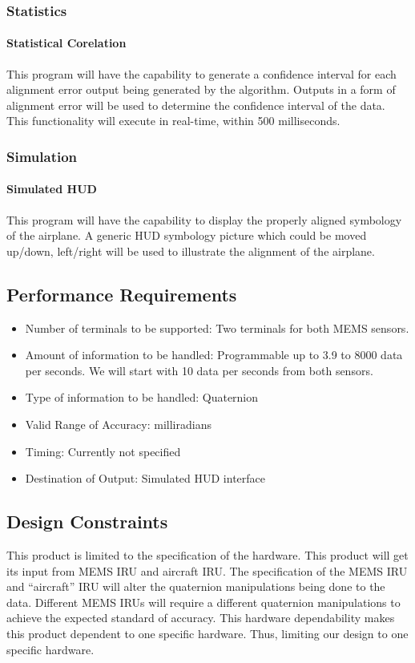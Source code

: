 \subsubsection{Statistics}
\paragraph{Statistical Corelation}
This program will have the capability to generate a confidence interval for each alignment error output being generated by the algorithm. Outputs in a form of alignment error will be used to determine the confidence interval of the data. This functionality will execute in real-time, within 500 milliseconds. 
\\
\subsubsection{Simulation}
\paragraph{Simulated HUD}
This program will have the capability to display the properly aligned symbology of the airplane. A generic HUD symbology picture which could be moved up/down, left/right will be used to illustrate the alignment of the airplane.


\subsection{Performance Requirements}
\begin{itemize}
	\item Number of terminals to be supported: Two terminals for both MEMS sensors. 
	\item Amount of information to be handled: Programmable up to 3.9 to 8000 data per seconds. We will start with 10 data per seconds from both sensors. 
	\item Type of information to be handled: Quaternion 
	\item Valid Range of Accuracy: milliradians 
	\item Timing: Currently not specified 
	\item Destination of Output: Simulated HUD interface
\end{itemize}	

\subsection{Design Constraints}
This product is limited to the specification of the hardware. This product will get its input from MEMS IRU and aircraft IRU. The specification of the MEMS IRU and “aircraft” IRU will alter the quaternion manipulations being done to the data.  Different MEMS IRUs will require a different quaternion manipulations to achieve the expected standard of accuracy. This hardware dependability makes this product dependent to one specific hardware. Thus, limiting our design to one specific hardware.

